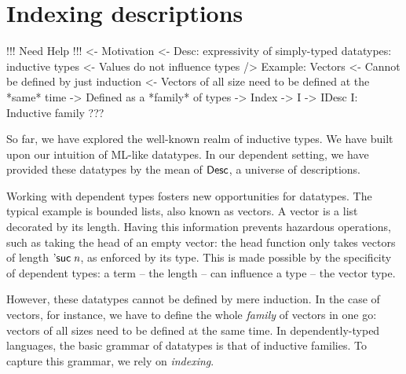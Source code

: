\section{Indexing descriptions}
\label{sec:indexing-desc}

\begin{wstructure}
!!! Need Help !!!
<- Motivation
    <- Desc: expressivity of simply-typed datatypes: inductive types
        <- Values do not influence types
    /> Example: Vectors
        <- Cannot be defined by just induction
            <- Vectors of all size need to be defined at the *same* time
            -> Defined as a *family* of types
                -> Index
        -> I -> IDesc I: Inductive family
    ???
\end{wstructure}

So far, we have explored the well-known realm of inductive types. We
have built upon our intuition of ML-like datatypes. In our dependent
setting, we have provided these datatypes by the mean of $\Desc$, a
universe of descriptions.

Working with dependent types fosters new opportunities for
datatypes. The typical example is bounded lists, also known as
vectors. A vector is a list decorated by its length. Having this
information prevents hazardous operations, such as taking the head of
an empty vector: the head function only takes vectors of length
$\NatSuc{\V{n}}$, as enforced by its type. This is made possible by
the specificity of dependent types: a term -- the length -- can
influence a type -- the vector type.

However, these datatypes cannot be defined by mere induction. In the
case of vectors, for instance, we have to define the whole
\emph{family} of vectors in one go: vectors of all sizes need to be
defined at the same time. In dependently-typed languages, the basic
grammar of datatypes is that of inductive families. To capture this
grammar, we rely on \emph{indexing}.



